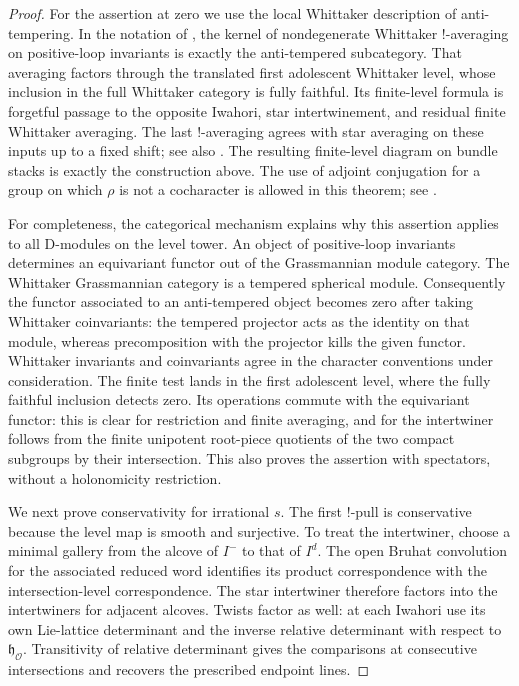 \documentclass[11pt]{article}
\numberwithin{equation}{section}
\theoremstyle{definition}
\theoremstyle{remark}
\begin{document}
\begin{proof}
For the assertion at zero we use the local Whittaker description of
anti-tempering.  In the notation of
\cite[Lemmas~4.2.0.1 and~4.3.0.1, Equation~(4.3.1)]{FaergemanRaskin},
the kernel of nondegenerate Whittaker $!$-averaging on positive-loop
invariants is exactly the anti-tempered subcategory.  That averaging
factors through the translated first adolescent Whittaker level, whose
inclusion in the full Whittaker category is fully faithful.  Its
finite-level formula is forgetful passage to the opposite Iwahori,
star intertwinement, and residual finite Whittaker averaging.  The last
$!$-averaging agrees with star averaging on these inputs up to a fixed
shift; see also \cite[Section~3.1, Lemma~3.1.4]{BogdanovaWhit}.
The resulting finite-level diagram on bundle stacks is exactly the
construction above.  The use of adjoint conjugation for a group on which
$\rho$ is not a cocharacter is allowed in this theorem; see
\cite[Remark~4.4.0.1]{FaergemanRaskin}.

For completeness, the categorical mechanism explains why this assertion
applies to all D-modules on the level tower.  An object of positive-loop
invariants determines an equivariant functor out of the Grassmannian
module category.  The Whittaker Grassmannian category is a tempered
spherical module.  Consequently the functor associated to an
anti-tempered object becomes zero after taking Whittaker coinvariants:
the tempered projector acts as the identity on that module, whereas
precomposition with the projector kills the given functor.  Whittaker
invariants and coinvariants agree in the character conventions under
consideration.  The finite test lands in the first adolescent level,
where the fully faithful inclusion detects zero.  Its operations commute
with the equivariant functor: this is clear for restriction and finite
averaging, and for the intertwiner follows from the finite unipotent
root-piece quotients of the two compact subgroups by their intersection.
This also proves the assertion with spectators, without a holonomicity
restriction.

We next prove conservativity for irrational $s$.  The first $!$-pull is
conservative because the level map is smooth and surjective.  To treat
the intertwiner, choose a minimal gallery from the alcove of $I^-$ to
that of $I^d$.  The open Bruhat convolution for the associated reduced
word identifies its product correspondence with the intersection-level
correspondence.  The star intertwiner therefore factors into the
intertwiners for adjacent alcoves.  Twists factor as well: at each
Iwahori use its own Lie-lattice determinant and the inverse relative
determinant with respect to $\mathfrak h_{\mathcal O}$.  Transitivity of
relative determinant gives the comparisons at consecutive intersections
and recovers the prescribed endpoint lines.


\end{proof}
\end{document}
